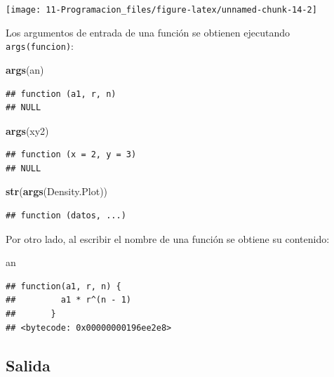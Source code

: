 \documentclass[]{book}
\newenvironment{Shaded}{\begin{snugshade}}{\end{snugshade}}
\newcommand{\KeywordTok}[1]{\textcolor[rgb]{0.13,0.29,0.53}{\textbf{#1}}}
\newcommand{\NormalTok}[1]{#1}
\begin{document}
\begin{center}\texttt{[image: 11-Programacion\_files/figure-latex/unnamed-chunk-14-2]} \end{center}

Los argumentos de entrada de una función se obtienen ejecutando \texttt{args(funcion)}:

\begin{Shaded}
\begin{Highlighting}[]
\KeywordTok{args}\NormalTok{(an)}
\end{Highlighting}
\end{Shaded}

\begin{verbatim}
## function (a1, r, n) 
## NULL
\end{verbatim}

\begin{Shaded}
\begin{Highlighting}[]
\KeywordTok{args}\NormalTok{(xy2)}
\end{Highlighting}
\end{Shaded}

\begin{verbatim}
## function (x = 2, y = 3) 
## NULL
\end{verbatim}

\begin{Shaded}
\begin{Highlighting}[]
\KeywordTok{str}\NormalTok{(}\KeywordTok{args}\NormalTok{(Density.Plot))}
\end{Highlighting}
\end{Shaded}

\begin{verbatim}
## function (datos, ...)
\end{verbatim}

Por otro lado, al escribir el nombre de una función se obtiene su
contenido:

\begin{Shaded}
\begin{Highlighting}[]
\NormalTok{an}
\end{Highlighting}
\end{Shaded}

\begin{verbatim}
## function(a1, r, n) {
##         a1 * r^(n - 1)
##       }
## <bytecode: 0x00000000196ee2e8>
\end{verbatim}

\hypertarget{salida}{%
\subsection{Salida}\label{salida}}
\end{document}
